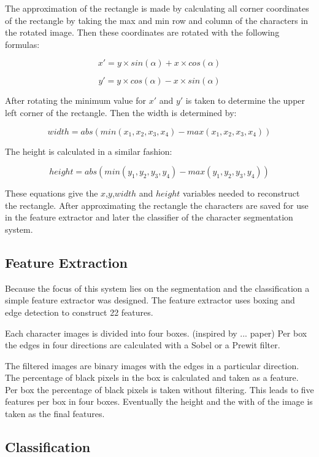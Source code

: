 The approximation of the rectangle is made by calculating  all corner coordinates of the rectangle by taking the max and min row and column of the characters in the rotated image. Then these coordinates are rotated with the following formulas:

\begin{equation}
    x' = y \times sin(\alpha) + x \times cos(\alpha)
\end{equation}

\begin{equation}
    y' = y \times cos(\alpha) - x \times sin(\alpha)
\end{equation}

After rotating the minimum value for $x'$ and $y'$ is taken to determine the upper left corner of the rectangle. Then the width is determined by:

\begin{equation}
    width = abs(min(x_1,x_2,x_3,x_4) - max(x_1,x_2,x_3,x_4))
\end{equation}

The height is calculated in a similar fashion:

\begin{equation}
    height = abs(min(y_1,y_2,y_3,y_4) - max(y_1,y_2,y_3,y_4))
\end{equation}

These equations give the $x$,$y$,$width$ and $height$ variables needed to reconstruct the rectangle. After approximating the rectangle the characters are saved for use in the feature extractor and later the classifier of the character segmentation system.

\subsection{Feature Extraction}


Because the focus of this system lies on the segmentation and the classification a simple feature extractor was designed. The feature extractor uses boxing and edge detection to construct 22 features.

Each character images is divided into four boxes. (inspired by ... paper) Per box the edges in four directions are calculated with a Sobel or a Prewit filter.



The filtered images are binary images with the edges in a particular direction. The percentage of black pixels in the box is calculated and taken as a feature. Per box the percentage of black pixels is taken without filtering. This leads to five features per box in four boxes. Eventually the height and the with of the image is taken as the final features.




\subsection{Classification}





